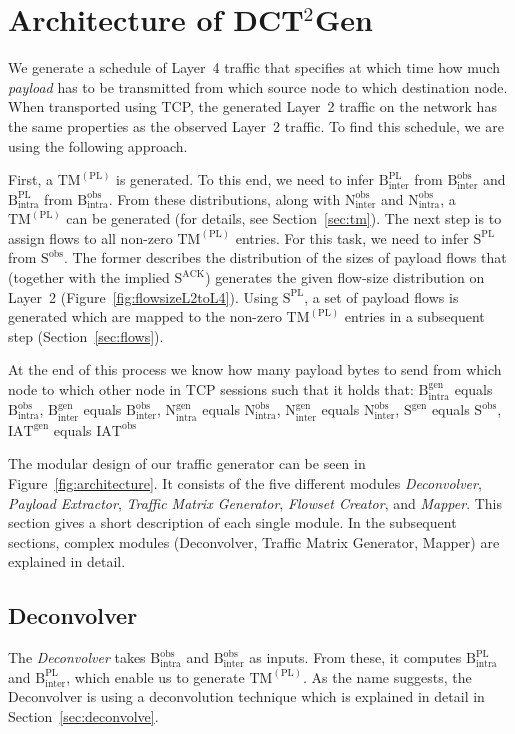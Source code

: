 \documentclass[journal,10pt]{IEEEtran}
\newcommand{\genname}{DCT${^2}$Gen}
\newcommand{\lt}{Layer~2}
\newcommand{\pltm}{\ensuremath{\mathrm{TM}^{(\mathrm{PL})}}}
\newcommand{\bytes}[2]{\ensuremath{\mathrm{B}^{\mathrm{#1}}_{\mathrm{#2}}}}
\newcommand{\partners}[2]{\ensuremath{\mathrm{N}^{\mathrm{#1}}_{\mathrm{#2}}}}
\newcommand{\iat}[1] {\ensuremath{\mathrm{IAT}^{\mathrm{#1}}}}
\newcommand{\size}[1]{\ensuremath{\mathrm{S}  ^{\mathrm{#1}}}}
\begin{document}
\section{Architecture of \genname{}}
\label{sec:architecture}

We generate a schedule of Layer~4 traffic
that specifies at which time how much \emph{payload} has to be transmitted from which source node to which destination node.
When transported using TCP, the generated \lt{} traffic on the network has the same properties as the observed \lt{} traffic.
To find this schedule, we are using the following approach.

		
First, a \pltm{} is generated.
To this end, we need to infer \bytes{PL}{inter} from \bytes{obs}{inter} and \bytes{PL}{intra} from \bytes{obs}{intra}.
From these distributions, along with \partners{obs}{inter} and \partners{obs}{intra}, a \pltm{} can be generated (for details, see Section~\ref{sec:tm}).
The next step is to assign flows to all non-zero \pltm{} entries.
For this task, we need to infer \size{PL} from \size{obs}.
The former describes the distribution of
the sizes of payload flows that (together with the implied \size{ACK}) generates the given flow-size distribution on Layer~2
(Figure~\ref{fig:flowsizeL2toL4}).
Using \size{PL}, a set of payload flows is generated which are mapped to the non-zero \pltm{} entries in a subsequent step (Section~\ref{sec:flows}).

At the end of this process we know how many payload bytes to send from which node to which other node in TCP sessions such 
that it holds that: 
\bytes{gen}{intra} equals \bytes{obs}{intra}, 
\bytes{gen}{inter} equals \bytes{obs}{inter},
\partners{gen}{intra} equals \partners{obs}{intra},
\partners{gen}{inter} equals \partners{obs}{inter},
\size{gen} equals \size{obs},
\iat{gen} equals \iat{obs}


The modular design of our traffic generator can be seen in Figure~\ref{fig:architecture}. It consists of the five different modules
\emph{Deconvolver}, 
\emph{Payload Extractor},
\emph{Traffic Matrix Generator},
\emph{Flowset Creator}, and 
\emph{Mapper}.
This section gives a short description of each single module. In the subsequent sections, complex modules 
(Deconvolver, Traffic Matrix Generator, Mapper) are explained in detail.

\subsection{Deconvolver}
The \emph{Deconvolver} takes \bytes{obs}{intra} and \bytes{obs}{inter} as inputs.
From these, it computes \bytes{PL}{intra} and \bytes{PL}{inter},
which enable us to generate \pltm{}.
As the name suggests, the Deconvolver is using a deconvolution technique which is explained in detail in Section~\ref{sec:deconvolve}.
\end{document}
